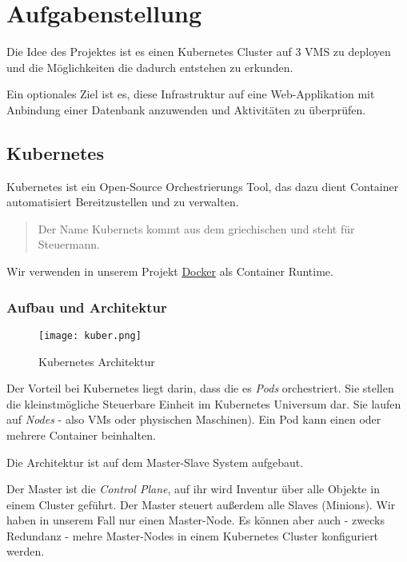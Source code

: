 \hypertarget{aufgabenstellung}{%
\section{Aufgabenstellung}\label{aufgabenstellung}}

Die Idee des Projektes ist es einen Kubernetes Cluster auf 3 VMS zu
deployen und die Möglichkeiten die dadurch entstehen zu erkunden.

Ein optionales Ziel ist es, diese Infrastruktur auf eine Web-Applikation
mit Anbindung einer Datenbank anzuwenden und Aktivitäten zu überprüfen.

\hypertarget{kubernetes}{%
\subsection{Kubernetes}\label{kubernetes}}

Kubernetes ist ein Open-Source Orchestrierungs Tool, das dazu dient
Container automatisiert Bereitzustellen und zu verwalten.

\begin{quote}
Der Name Kubernets kommt aus dem griechischen und steht für Steuermann.
\end{quote}

Wir verwenden in unserem Projekt \href{https://www.docker.com/}{Docker}
als Container Runtime.

\hypertarget{aufbau-und-architektur}{%
\subsubsection{Aufbau und Architektur}\label{aufbau-und-architektur}}

\begin{figure}
\centering
\texttt{[image: kuber.png]}
\caption{Kubernetes Architektur}
\end{figure}

Der Vorteil bei Kubernetes liegt darin, dass die es \emph{Pods}
orchestriert. Sie stellen die kleinstmögliche Steuerbare Einheit im
Kubernetes Universum dar. Sie laufen auf \emph{Nodes} - also VMs oder
physischen Maschinen). Ein Pod kann einen oder mehrere Container
beinhalten.

Die Architektur ist auf dem Master-Slave System aufgebaut.

Der Master ist die \emph{Control Plane}, auf ihr wird Inventur über alle
Objekte in einem Cluster geführt. Der Master steuert außerdem alle
Slaves (Minions). Wir haben in unserem Fall nur einen Master-Node. Es
können aber auch - zwecks Redundanz - mehre Master-Nodes in einem
Kubernetes Cluster konfiguriert werden.

